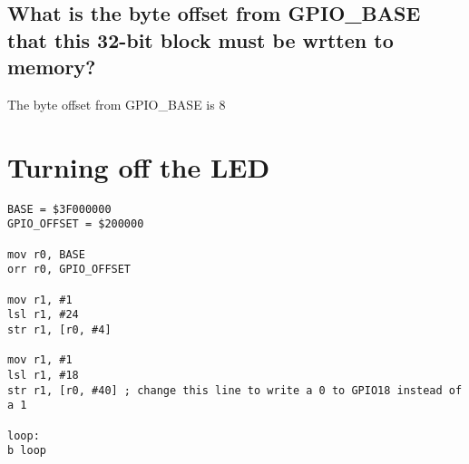 \documentclass[11pt]{scrartcl}
\begin{document}
\subsection*{What is the byte offset from GPIO\_BASE that this 32-bit block must be wrtten to memory?}
The byte offset from GPIO\_BASE is 8

\section*{Turning off the LED}
\begin{verbatim}
BASE = $3F000000
GPIO_OFFSET = $200000

mov r0, BASE
orr r0, GPIO_OFFSET

mov r1, #1
lsl r1, #24
str r1, [r0, #4]

mov r1, #1
lsl r1, #18
str r1, [r0, #40] ; change this line to write a 0 to GPIO18 instead of a 1

loop:
b loop
\end{verbatim}
\end{document}
